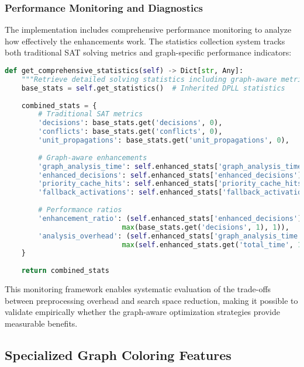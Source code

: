 \subsubsection{Performance Monitoring and Diagnostics}

The implementation includes comprehensive performance monitoring to analyze how effectively the enhancements work. The statistics collection system tracks both traditional SAT solving metrics and graph-specific performance indicators:

\begin{lstlisting}[language=Python, caption=Enhanced Performance Monitoring]
def get_comprehensive_statistics(self) -> Dict[str, Any]:
    """Retrieve detailed solving statistics including graph-aware metrics"""
    base_stats = self.get_statistics()  # Inherited DPLL statistics
    
    combined_stats = {
        # Traditional SAT metrics
        'decisions': base_stats.get('decisions', 0),
        'conflicts': base_stats.get('conflicts', 0),
        'unit_propagations': base_stats.get('unit_propagations', 0),
        
        # Graph-aware enhancements
        'graph_analysis_time': self.enhanced_stats['graph_analysis_time'],
        'enhanced_decisions': self.enhanced_stats['enhanced_decisions'],
        'priority_cache_hits': self.enhanced_stats['priority_cache_hits'],
        'fallback_activations': self.enhanced_stats['fallback_activations'],
        
        # Performance ratios
        'enhancement_ratio': (self.enhanced_stats['enhanced_decisions'] / 
                            max(base_stats.get('decisions', 1), 1)),
        'analysis_overhead': (self.enhanced_stats['graph_analysis_time'] / 
                            max(self.enhanced_stats.get('total_time', 1), 1))
    }
    
    return combined_stats
\end{lstlisting}

This monitoring framework enables systematic evaluation of the trade-offs between preprocessing overhead and search space reduction, making it possible to validate empirically whether the graph-aware optimization strategies provide measurable benefits.

\subsection{Specialized Graph Coloring Features}

